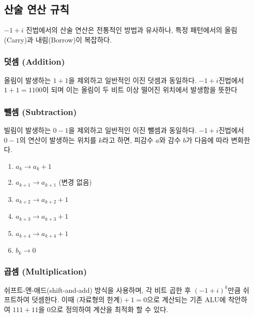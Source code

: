 \documentclass[10pt,a4paper,notitlepage]{report}
\begin{document}
\begin{multicols*}{2}
\subsection{산술 연산 규칙}
$-1 + i$ 진법에서의 산술 연산은 전통적인 방법과 유사하나, 특정 패턴에서의 올림(Carry)과 내림(Borrow)이 복잡하다.

\subsubsection{덧셈 (Addition)}
올림이 발생하는 $1+1$을 제외하고 일반적인 이진 덧셈과 동일하다. $-1 + i$진법에서 $1+1=1100$이 되며 이는 올림이 두 비트 이상 떨어진 위치에서 발생함을 뜻한다

\subsubsection{뺄셈 (Subtraction)}
빌림이 발생하는 $0-1$을 제외하고 일반적인 이진 뺄셈과 동일하다. $-1 + i$진법에서 $0-1$의 연산이 발생하는 위치를 $k$라고 하면, 피감수 $a$와 감수 $b$가 다음에 따라 변화한다.
\begin{enumerate}
\item $a_k \to a_k + 1$
\item $a_{k+1} \to a_{k+1}$ (변경 없음)
\item $a_{k+2} \to a_{k+2} + 1$
\item $a_{k+3} \to a_{k+3} + 1$
\item $a_{k+4} \to a_{k+4} + 1$
\item $b_k \to 0$
\end{enumerate}

\subsubsection{곱셈 (Multiplication)}
쉬프트-앤-애드(shift-and-add) 방식을 사용하며, 각 비트 곱한 후 $(-1 + i)^k$만큼 쉬프트하여 덧셈한다. 이때 $($자료형의 한계$)+1=0$으로 계산되는 기존 ALU에 착안하여 $111+11$을 $0$으로 정의하여 계산을 최적화 할 수 있다.


\end{multicols*}
\end{document}
